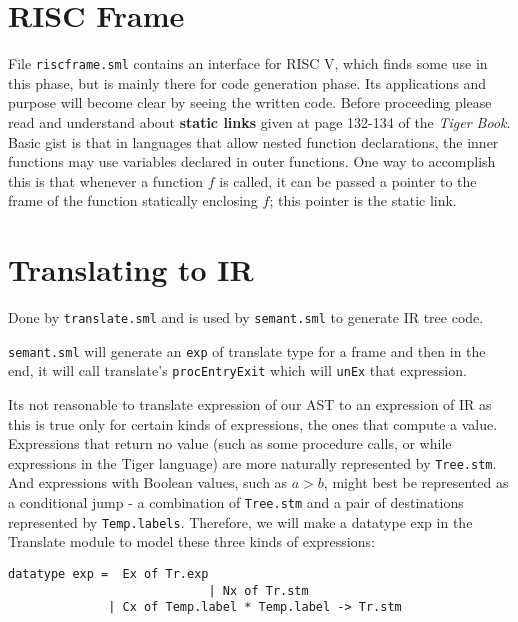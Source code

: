 \section{RISC Frame}


File \texttt{riscframe.sml} contains an interface for RISC V, which finds some use in this phase, but is mainly there for code generation phase. Its applications and purpose will become clear by seeing the written code. Before proceeding please read and understand about \textbf{static links} given at page 132-134 of the \textit{Tiger Book}\cite{tigerbook}. Basic gist is that in languages that allow nested function declarations, the inner functions may use variables declared in outer functions. One way to accomplish this is that whenever a function $f$ is called, it can be passed a pointer to the frame of the function statically enclosing $f$; this pointer is the static link.

\section{Translating to IR}


Done by \texttt{translate.sml} and is used by \texttt{semant.sml} to generate IR tree code.

\texttt{semant.sml} will generate an \texttt{exp} of translate type for a frame and then in the end, it will call translate's \texttt{procEntryExit} which will \texttt{unEx} that expression.


Its not reasonable to translate expression of our AST to an expression of IR as this is true only for certain kinds of expressions, the ones that  compute a value. Expressions that return no value (such as some procedure calls, or while expressions in the Tiger language) are more naturally represented by \texttt{Tree.stm}. And expressions with Boolean values, such as $a > b$, might best be represented as a conditional jump - a combination of \texttt{Tree.stm} and a pair of destinations represented by \texttt{Temp.labels}. Therefore, we will make a datatype exp in the Translate module to model these three kinds of expressions:

\begin{verbatim}
datatype exp =  Ex of Tr.exp
							| Nx of Tr.stm
              | Cx of Temp.label * Temp.label -> Tr.stm
\end{verbatim}

